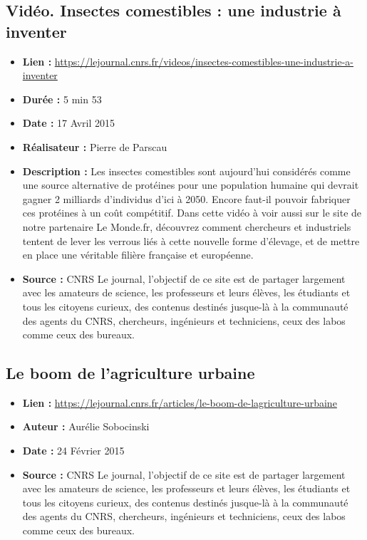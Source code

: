 \documentclass[8pt]{article}
\begin{document}
\newpage
\subsection{Vidéo. Insectes comestibles : une industrie à inventer}

\begin{itemize}
	\item \textbf{Lien : }  \url{https://lejournal.cnrs.fr/videos/insectes-comestibles-une-industrie-a-inventer} 
	\item \textbf{Durée : } 5 min 53
	\item \textbf{Date : } 17 Avril 2015
	\item \textbf{Réalisateur : } Pierre de Parscau
	\item \textbf{Description : } Les insectes comestibles sont aujourd'hui considérés comme une source alternative de protéines pour une population humaine qui devrait gagner 2 milliards d'individus d'ici à 2050. Encore faut-il pouvoir fabriquer ces protéines à un coût compétitif. Dans cette vidéo à voir aussi sur le site de notre partenaire Le Monde.fr, découvrez comment chercheurs et industriels tentent de lever les verrous liés à cette nouvelle forme d'élevage, et de mettre en place une véritable filière française et européenne.
	\item \textbf{Source : } CNRS Le journal, l'objectif de ce site est de partager largement avec les amateurs de science, les professeurs et leurs élèves, les étudiants et tous les citoyens curieux, des contenus destinés jusque-là à la communauté des agents du CNRS, chercheurs, ingénieurs et techniciens, ceux des labos comme ceux des bureaux.
\end{itemize}



\newpage
\subsection{Le boom de l’agriculture urbaine}

\begin{itemize}
	\item \textbf{Lien : }  \url{https://lejournal.cnrs.fr/articles/le-boom-de-lagriculture-urbaine} 
	\item \textbf{Auteur : } Aurélie Sobocinski
	\item \textbf{Date : }  24 Février 2015 
	\item \textbf{Source : } CNRS Le journal, l'objectif de ce site est de partager largement avec les amateurs de science, les professeurs et leurs élèves, les étudiants et tous les citoyens curieux, des contenus destinés jusque-là à la communauté des agents du CNRS, chercheurs, ingénieurs et techniciens, ceux des labos comme ceux des bureaux.
\end{itemize}
\end{document}

